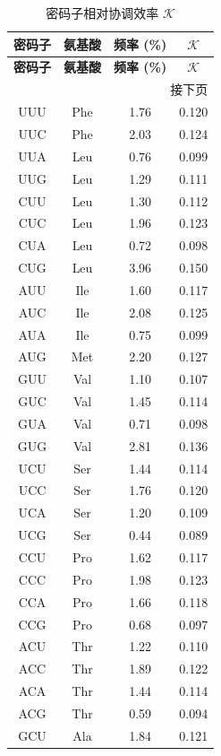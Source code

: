 \documentclass[12pt,a4paper]{article}
\newcommand{\REL}{\mathcal{K}}          %
\begin{document}
	\begin{longtable}{|c|c|c|c|}
		\caption{密码子相对协调效率 \(\REL\)}\label{tab:codons}\\
		\hline
		\textbf{密码子} & \textbf{氨基酸} & \textbf{频率 (\%)} & \(\REL\) \\
		\hline
		\endfirsthead
		\hline
		\textbf{密码子} & \textbf{氨基酸} & \textbf{频率 (\%)} & \(\REL\) \\
		\hline
		\endhead
		\hline
		\multicolumn{4}{r}{接下页}\\
		\endfoot
		\hline
		\endlastfoot
		UUU & Phe & 1.76 & 0.120 \\
		UUC & Phe & 2.03 & 0.124 \\
		UUA & Leu & 0.76 & 0.099 \\
		UUG & Leu & 1.29 & 0.111 \\
		CUU & Leu & 1.30 & 0.112 \\
		CUC & Leu & 1.96 & 0.123 \\
		CUA & Leu & 0.72 & 0.098 \\
		CUG & Leu & 3.96 & 0.150 \\
		AUU & Ile & 1.60 & 0.117 \\
		AUC & Ile & 2.08 & 0.125 \\
		AUA & Ile & 0.75 & 0.099 \\
		AUG & Met & 2.20 & 0.127 \\
		GUU & Val & 1.10 & 0.107 \\
		GUC & Val & 1.45 & 0.114 \\
		GUA & Val & 0.71 & 0.098 \\
		GUG & Val & 2.81 & 0.136 \\
		UCU & Ser & 1.44 & 0.114 \\
		UCC & Ser & 1.76 & 0.120 \\
		UCA & Ser & 1.20 & 0.109 \\
		UCG & Ser & 0.44 & 0.089 \\
		CCU & Pro & 1.62 & 0.117 \\
		CCC & Pro & 1.98 & 0.123 \\
		CCA & Pro & 1.66 & 0.118 \\
		CCG & Pro & 0.68 & 0.097 \\
		ACU & Thr & 1.22 & 0.110 \\
		ACC & Thr & 1.89 & 0.122 \\
		ACA & Thr & 1.44 & 0.114 \\
		ACG & Thr & 0.59 & 0.094 \\
		GCU & Ala & 1.84 & 0.121 \\

\end{longtable}
\end{document}
